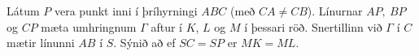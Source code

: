 Látum $P$ vera punkt inni í þríhyrningi $ABC$ (með $CA\neq CB$). Línurnar $AP,\ BP$ og $CP$ mæta umhringnum $\Gamma$ aftur í $K$, $L$ og $M$ í þessari röð. Snertillinn við $\Gamma$ í $C$ mætir línunni $AB$ í $S$. Sýnið að ef $SC=SP$ er $MK=ML$.